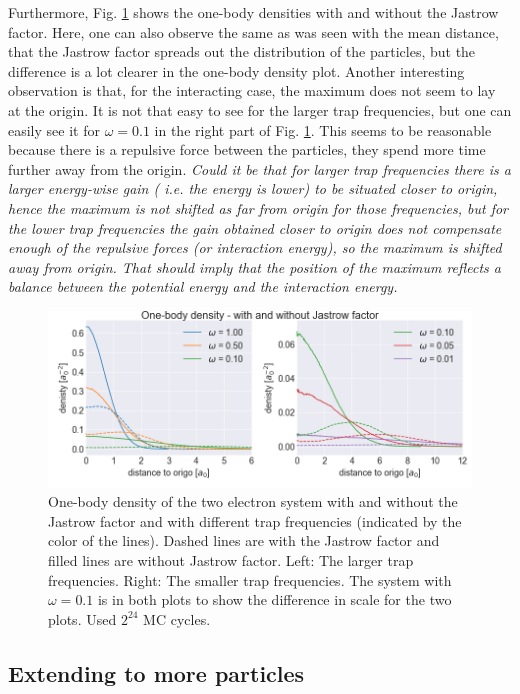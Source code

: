Furthermore, Fig. \ref{fig:one_body_density_interaction_2p} shows the one-body densities with and without the Jastrow factor. Here, one can also observe the same as was seen with the mean distance, that the Jastrow factor spreads out the distribution of the particles, but the difference is a lot clearer in the one-body density plot. Another interesting observation is that, for the interacting case, the maximum does not seem to lay at the origin. It is not that easy to see for the larger trap frequencies, but one can easily see it for $\omega = 0.1$ in the right part of Fig. \ref{fig:one_body_density_interaction_2p}. This seems to be reasonable because there is a repulsive force between the particles, they spend more time further away from the origin. \textit{Could it be that for larger trap frequencies there is a larger energy-wise gain ( i.e. the energy is lower) to be situated closer to origin, hence the maximum is not shifted as far from origin for those frequencies, but for the lower trap frequencies the gain obtained closer to origin does not compensate enough of the repulsive forces (or interaction energy), so the maximum is shifted away from origin. That should imply that the position of the maximum reflects a balance between the potential energy and the interaction energy. }

\begin{figure}[H]
\center
\includegraphics[width=0.85\linewidth]{../Results/one_body_density_interaction_2p}\caption{One-body density of the two electron system with and without the Jastrow factor and with different trap frequencies (indicated by the color of the lines). Dashed lines are with the Jastrow factor and filled lines are without Jastrow factor. Left: The larger trap frequencies. Right: The smaller trap frequencies.  The system with $\omega = 0.1$ is in both plots to show the difference in scale for the two plots. Used $2^{24}$ MC cycles. }\label{fig:one_body_density_interaction_2p}
\end{figure}

\subsection{Extending to more particles}

